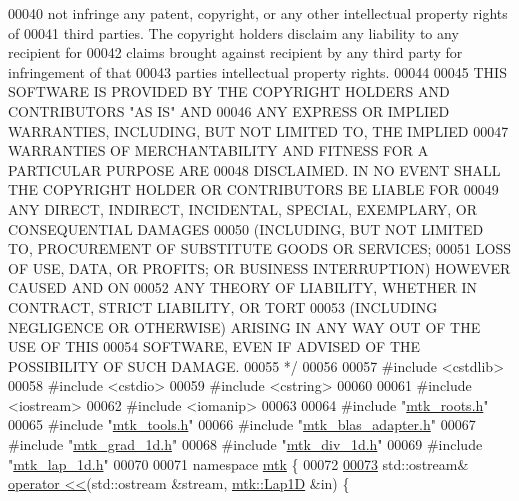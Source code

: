 \begin{DoxyCode}
00040 \textcolor{comment}{not infringe any patent, copyright, or any other intellectual property rights of}
00041 \textcolor{comment}{third parties. The copyright holders disclaim any liability to any recipient for}
00042 \textcolor{comment}{claims brought against recipient by any third party for infringement of that}
00043 \textcolor{comment}{parties intellectual property rights.}
00044 \textcolor{comment}{}
00045 \textcolor{comment}{THIS SOFTWARE IS PROVIDED BY THE COPYRIGHT HOLDERS AND CONTRIBUTORS "AS IS" AND}
00046 \textcolor{comment}{ANY EXPRESS OR IMPLIED WARRANTIES, INCLUDING, BUT NOT LIMITED TO, THE IMPLIED}
00047 \textcolor{comment}{WARRANTIES OF MERCHANTABILITY AND FITNESS FOR A PARTICULAR PURPOSE ARE}
00048 \textcolor{comment}{DISCLAIMED. IN NO EVENT SHALL THE COPYRIGHT HOLDER OR CONTRIBUTORS BE LIABLE FOR}
00049 \textcolor{comment}{ANY DIRECT, INDIRECT, INCIDENTAL, SPECIAL, EXEMPLARY, OR CONSEQUENTIAL DAMAGES}
00050 \textcolor{comment}{(INCLUDING, BUT NOT LIMITED TO, PROCUREMENT OF SUBSTITUTE GOODS OR SERVICES;}
00051 \textcolor{comment}{LOSS OF USE, DATA, OR PROFITS; OR BUSINESS INTERRUPTION) HOWEVER CAUSED AND ON}
00052 \textcolor{comment}{ANY THEORY OF LIABILITY, WHETHER IN CONTRACT, STRICT LIABILITY, OR TORT}
00053 \textcolor{comment}{(INCLUDING NEGLIGENCE OR OTHERWISE) ARISING IN ANY WAY OUT OF THE USE OF THIS}
00054 \textcolor{comment}{SOFTWARE, EVEN IF ADVISED OF THE POSSIBILITY OF SUCH DAMAGE.}
00055 \textcolor{comment}{*/}
00056 
00057 \textcolor{preprocessor}{#include <cstdlib>}
00058 \textcolor{preprocessor}{#include <cstdio>}
00059 \textcolor{preprocessor}{#include <cstring>}
00060 
00061 \textcolor{preprocessor}{#include <iostream>}
00062 \textcolor{preprocessor}{#include <iomanip>}
00063 
00064 \textcolor{preprocessor}{#include "\hyperlink{mtk__roots_8h}{mtk\_roots.h}"}
00065 \textcolor{preprocessor}{#include "\hyperlink{mtk__tools_8h}{mtk\_tools.h}"}
00066 \textcolor{preprocessor}{#include "\hyperlink{mtk__blas__adapter_8h}{mtk\_blas\_adapter.h}"}
00067 \textcolor{preprocessor}{#include "\hyperlink{mtk__grad__1d_8h}{mtk\_grad\_1d.h}"}
00068 \textcolor{preprocessor}{#include "\hyperlink{mtk__div__1d_8h}{mtk\_div\_1d.h}"}
00069 \textcolor{preprocessor}{#include "\hyperlink{mtk__lap__1d_8h}{mtk\_lap\_1d.h}"}
00070 
00071 \textcolor{keyword}{namespace }\hyperlink{namespacemtk}{mtk} \{
00072 
\hypertarget{mtk__lap__1d_8cc_source_l00073}{}\hyperlink{namespacemtk_af667c01a388ef1815d549b09b2d76bcc}{00073} std::ostream& \hyperlink{namespacemtk_ad3bcf52cda59ddb5fc7b4bdce76c46dc}{operator <<}(std::ostream &stream, \hyperlink{classmtk_1_1Lap1D}{mtk::Lap1D} &in) \{

\end{DoxyCode}
